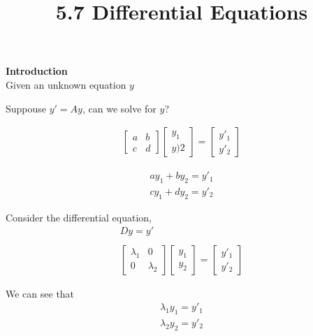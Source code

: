 \documentclass{article}
\title{5.7 Differential Equations}
\begin{document}
    \maketitle
    \textbf{Introduction}\\
    Given an unknown equation $ y $ 

    Suppouse $ y'=Ay $, can we solve for $ y $?

    \[
        \begin{gathered}
        \begin{bmatrix}
            a &b\\
            c &d
        \end{bmatrix}
        \begin{bmatrix}
            y_1\\
            y)2
        \end{bmatrix}=
        \begin{bmatrix}
            y'_1\\
            y'_2
        \end{bmatrix}
        \end{gathered}
    \]

    \[
        \begin{gathered}
        ay_1+by_2=y'_1\\
        cy_1+dy_2=y'_2
        \end{gathered}
    \]

    Consider the differential equation,
    \[
        \begin{gathered}
        Dy=y'\\
        ~\\
        \begin{bmatrix}
            \lambda_1 &0\\
            0 &\lambda_2
        \end{bmatrix}
        \begin{bmatrix}
            y_1\\
            y_2
        \end{bmatrix}=
        \begin{bmatrix}
            y'_1\\
            y'_2
        \end{bmatrix}
        \end{gathered}
    \]

    We can see that
    \[
        \begin{gathered}
        \lambda_1 y_1=y'_1\\
        \lambda_2 y_2=y'_2
        \end{gathered}
    \]
\end{document}
